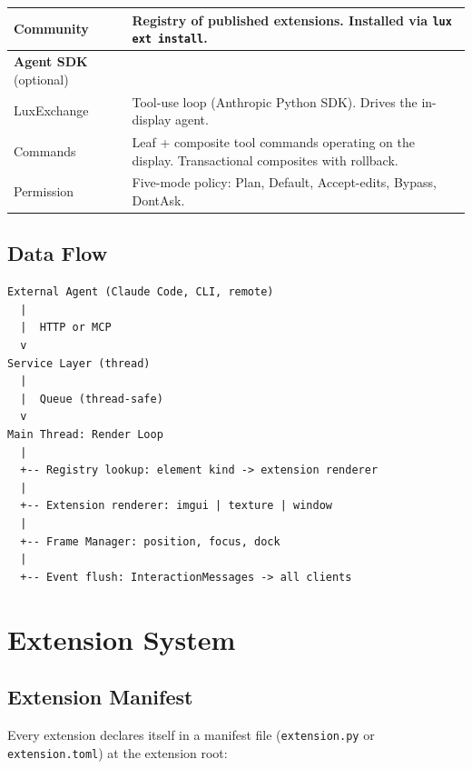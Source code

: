 \documentclass[a4paper,10pt]{article}
\begin{document}
\begin{center}
\begin{tabularx}{\linewidth}{@{}l>{\raggedright\arraybackslash}X@{}}
\quad Community     & Registry of published extensions.  Installed
  via \texttt{lux ext install}. \\
\midrule
\textbf{Agent SDK} (optional) & \\
\quad LuxExchange   & Tool-use loop (Anthropic Python SDK).  Drives
  the in-display agent. \\
\quad Commands      & Leaf + composite tool commands operating on the
  display.  Transactional composites with rollback. \\
\quad Permission    & Five-mode policy: Plan, Default, Accept-edits,
  Bypass, DontAsk. \\
\bottomrule
\end{tabularx}
\normalsize
\end{center}

\subsection{Data Flow}

\begin{verbatim}
External Agent (Claude Code, CLI, remote)
  |
  |  HTTP or MCP
  v
Service Layer (thread)
  |
  |  Queue (thread-safe)
  v
Main Thread: Render Loop
  |
  +-- Registry lookup: element kind -> extension renderer
  |
  +-- Extension renderer: imgui | texture | window
  |
  +-- Frame Manager: position, focus, dock
  |
  +-- Event flush: InteractionMessages -> all clients
\end{verbatim}

\section{Extension System}

\subsection{Extension Manifest}

Every extension declares itself in a manifest file
(\texttt{extension.py} or \texttt{extension.toml}) at the extension
root:
\end{document}
